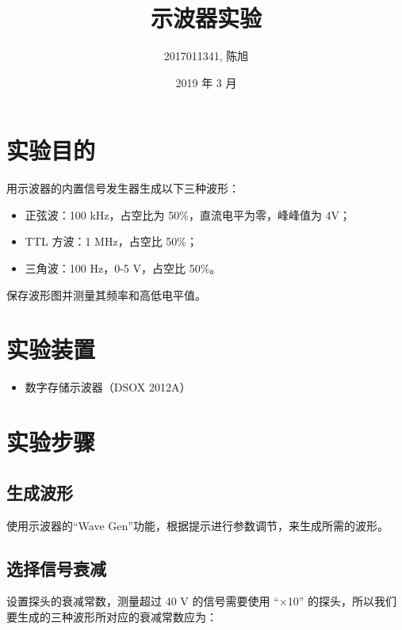 \documentclass[a4paper]{article}
\title{示波器实验}
\author{2017011341, 陈旭}
\date{2019 年 3 月}
\begin{document}
	\maketitle

	\section{实验目的}

		\par 用示波器的内置信号发生器生成以下三种波形：

		\begin{itemize}
			\item 正弦波：100 kHz，占空比为 50\%，直流电平为零，峰峰值为 4V；
			\item TTL 方波：1 MHz，占空比 50\%；
			\item 三角波：100 Hz，0-5 V，占空比 50\%。
		\end{itemize}

		\par 保存波形图并测量其频率和高低电平值。

	\section{实验装置}

		\begin{itemize}
			\item 数字存储示波器（DSOX 2012A）
		\end{itemize}

		\section{实验步骤}

		\subsection{生成波形}

			\par 使用示波器的“Wave Gen”功能，根据提示进行参数调节，来生成所需的波形。

		\subsection{选择信号衰减}

			\par 设置探头的衰减常数，测量超过 40 V 的信号需要使用 “$\times$10” 的探头，所以我们要生成的三种波形所对应的衰减常数应为：
\end{document}
